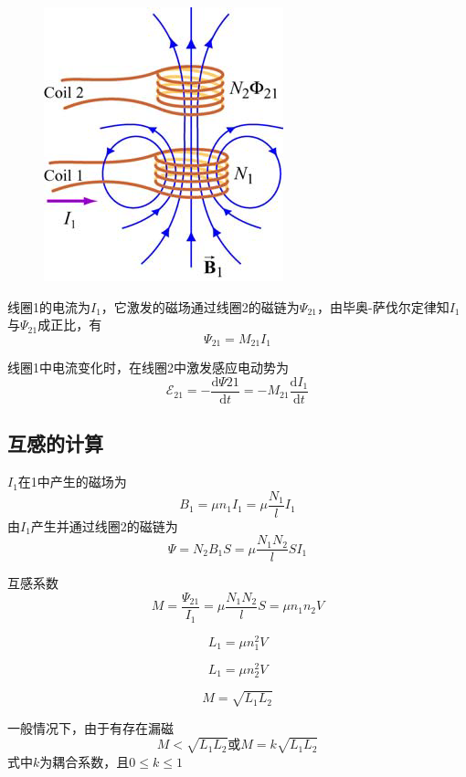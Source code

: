 \documentclass[12pt]{article}
\newcommand{\rmd}{\mathrm{d}}
\newcommand{\deriv}[2]{\frac{\rmd #1}{\rmd #2}}
\begin{document}
\begin{figure}[!h]
    \centering
    \includegraphics[width = .2\textwidth]{graphics/互感.png}
\end{figure}

线圈1的电流为\(I_1\)，它激发的磁场通过线圈2的磁链为\(\varPsi_{21}\)，由毕奥-萨伐尔定律知\(I_1\)与\(\varPsi_{21}\)成正比，有
\begin{equation}
    \varPsi_{21} = M_{21} I_1
\end{equation}

线圈1中电流变化时，在线圈2中激发感应电动势为
\begin{equation}
    \mathcal{E}_{21} = - \deriv{\varPsi{21}}{t} = -M_{21} \deriv{I_1}{t}
\end{equation}

\subsection{互感的计算}

\(I_1\)在1中产生的磁场为
\begin{equation}
    B_1 = \mu n_1 I_1 = \mu \frac{N_1}{l} I_1
\end{equation}
由\(I_1\)产生并通过线圈2的磁链为
\begin{equation}
    \varPsi = N_2 B_1 S = \mu \frac{N_1 N_2}{l} S I_1
\end{equation}

互感系数
\begin{equation}
    M = \frac{\varPsi_{21}}{I_1} = \mu \frac{N_1 N_2}{l} S = \mu n_1 n_2 V
\end{equation}

\begin{equation}
    L_1 = \mu n_1^2 V
\end{equation}

\begin{equation}
    L_1 = \mu n_2^2 V
\end{equation}

\begin{equation}
    M = \sqrt{L_1 L_2}
\end{equation}

一般情况下，由于有存在漏磁
\begin{equation}
    M < \sqrt{L_1 L_2} \text{或} M = k \sqrt{L_1 L_2}
\end{equation}
式中\(k\)为耦合系数，且\(0 \leq k \leq 1\)
\end{document}

